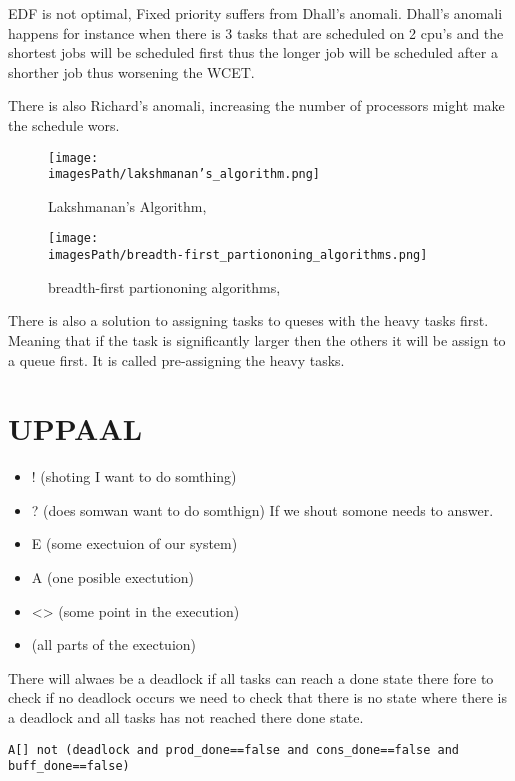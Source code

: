 EDF is not optimal, Fixed priority suffers from Dhall's anomali. 
Dhall's anomali happens for instance when there is 3 tasks that are
scheduled on 2 cpu's and the shortest jobs will be scheduled first thus
the longer job will be scheduled after a shorther job thus worsening the 
WCET.

There is also Richard's anomali, increasing the number of processors 
might make the schedule wors.

\begin{figure}[H]
    \centering
    \texttt{[image: \\imagesPath/lakshmanan's\_algorithm.png]}
    \caption{Lakshmanan's Algorithm, \cite{11-multiprocessor-2, p.6}}
    \label{lakshmanan's_algorithm}
\end{figure}

\begin{figure}[H]
    \centering
    \texttt{[image: \\imagesPath/breadth-first\_partiononing\_algorithms.png]}
    \caption{breadth-first partiononing algorithms, \cite{11-multiprocessor-2, p.6}}
    \label{breadth-first_partiononing_algorithms}
\end{figure}

There is also a solution to assigning tasks to queses with the heavy tasks first.
Meaning that if the task is significantly larger then the others it will be 
assign to a queue first. It is called pre-assigning the heavy tasks.


\section{UPPAAL}
\begin{itemize}
  \item ! (shoting I want to do somthing)
  \item ? (does somwan want to do somthign) If we shout somone needs to answer.
  \item E (some exectuion of our system)
  \item A (one posible exectution)
  \item <> (some point in the execution)
  \item [] (all parts of the exectuion)
\end{itemize}

There will alwaes be a deadlock if all tasks can reach a done state there fore to check if no deadlock occurs
we need to check that there is no state where there is a deadlock and all tasks has not reached there done state.
\begin{center}
  \texttt{A[] not (deadlock and prod\_done==false and cons\_done==false and buff\_done==false)}
\end{center}

